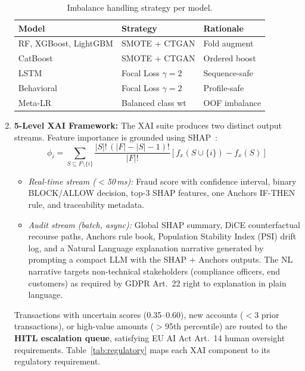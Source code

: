 \documentclass[10pt,a4paper,twocolumn]{article}
\begin{document}
\begin{enumerate}
    \begin{table}[H]
    \centering
    \caption{Imbalance handling strategy per model.}
    \label{tab:imbalance}
    {\footnotesize
    \begin{tabularx}{\linewidth}{@{}lXl@{}}
    \toprule
    \textbf{Model} & \textbf{Strategy} & \textbf{Rationale} \\
    \midrule
    RF, XGBoost, LightGBM & SMOTE + CTGAN & Fold augment \\
    CatBoost   & SMOTE + CTGAN     & Ordered boost \\
    LSTM        & Focal Loss $\gamma{=}2$ & Sequence-safe \\
    Behavioral  & Focal Loss $\gamma{=}2$ & Profile-safe \\
    Meta-LR     & Balanced class wt  & OOF imbalance \\
    \bottomrule
    \end{tabularx}
    }
    \end{table}

    \item \textbf{5-Level XAI Framework:} The XAI suite produces two distinct output streams. Feature importance is grounded using SHAP~\cite{lundberg2017}:
    \begin{equation}
    \phi_i = \!\sum_{S \subseteq F \setminus \{i\}} \frac{|S|!\,(|F|-|S|-1)!}{|F|!}\left[f_x(S \cup \{i\}) - f_x(S)\right]
    \end{equation}
    \begin{itemize}
        \item \textit{Real-time stream ($<$50\,ms):} Fraud score with confidence interval, binary BLOCK/ALLOW decision, top-3 SHAP features, one Anchors IF-THEN rule, and traceability metadata.
        \item \textit{Audit stream (batch, async):} Global SHAP summary, DiCE counterfactual recourse paths, Anchors rule book, Population Stability Index (PSI) drift log, and a Natural Language explanation narrative generated by prompting a compact LLM with the SHAP + Anchors outputs. The NL narrative targets non-technical stakeholders (compliance officers, end customers) as required by GDPR Art.~22 right to explanation in plain language.
    \end{itemize}
    Transactions with uncertain scores (0.35--0.60), new accounts ($<3$ prior transactions), or high-value amounts ($>$95th percentile) are routed to the \textbf{HITL escalation queue}, satisfying EU AI Act Art.~14 human oversight requirements. Table~\ref{tab:regulatory} maps each XAI component to its regulatory requirement.


\end{enumerate}
\end{document}
